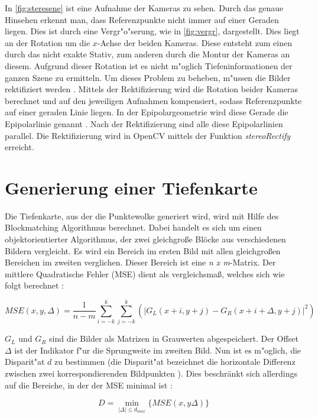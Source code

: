 \noindent In \ref{fig:steresene} ist eine Aufnahme der Kameras zu sehen. Durch das genaue Hinsehen erkennt man, dass Referenzpunkte nicht immer auf einer Geraden liegen. Dies ist durch eine Vergr"o"serung, wie in \ref{fig:vergr}, dargestellt. Dies liegt an der Rotation um die $x$-Achse der beiden Kameras. Diese entsteht zum einen durch das nicht exakte Stativ, zum anderen durch die Montur der Kameras an diesem. Aufgrund dieser Rotation ist es nicht m"oglich Tiefeninformationen der ganzen Szene zu ermitteln. Um dieses Problem zu beheben, m"ussen die Bilder rektifiziert werden \cite{zbs}. Mittels der Rektifizierung wird die Rotation beider Kameras berechnet und auf den jeweiligen Aufnahmen kompensiert, sodass Referenzpunkte auf einer geraden Linie liegen. In der Epipolargeometrie wird diese Gerade die Epipolarlinie genannt \cite{ocvs} \cite{wepi}. Nach der Rektifizierung sind alle diese Epipolarlinien parallel. Die Rektifizierung wird in OpenCV mittels der Funktion \textit{stereoRectify} erreicht.

\section{Generierung einer Tiefenkarte} 
\label{sec:gernerierungdep}

Die Tiefenkarte, aus der die Punktewolke generiert wird, wird mit Hilfe des Blockmatching Algorithmus berechnet. Dabei handelt es sich um einen objektorientierter Algorithmus, der zwei gleichgroße Blöcke aus verschiedenen Bildern vergleicht. Es wird ein Bereich im ersten Bild mit allen gleichgroßen Bereichen im zweiten verglichen. Dieser Bereich ist eine \textit{n x m}-Matrix. Der mittlere Quadratische Fehler (MSE) dient als vergleichsmaß, welches sich wie folgt berechnet \cite{HAW}:

\begin{equation}
MSE(x,y,\Delta) = \dfrac{1}{n-m} \sum_{i=-k}^k \sum_{j=-k}^k (|G_{L}(x+i, y+j) - G_{R}(x+i+\Delta, y+j)|^2)
\end{equation}

\noindent $G_{L}$ und $G_{R}$ sind die Bilder als Matrizen in Grauwerten abgespeichert. Der Offset $\Delta$ ist der Indikator f"ur die Sprungweite im zweiten Bild. Nun ist es m"oglich, die Disparit"at $d$ zu bestimmen (die Disparit"at bezeichnet die horizontale Differenz zwischen zwei korrespondierenden Bildpunkten \cite{disp}). Dies beschränkt sich allerdings auf die Bereiche, in der der MSE minimal ist \cite{HAW}:

\begin{equation}
D=\min_{|\Delta|\leq d_{max}} \{MSE(x,y\Delta)\}
\end{equation}

